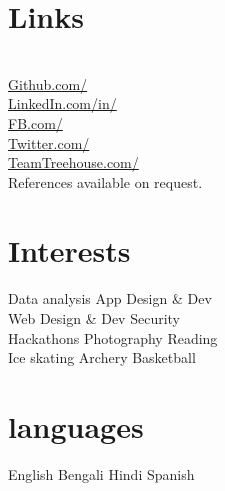 \documentclass[]{deedy-resume-openfont}
\begin{document}
\begin{minipage}[t]{0.32\textwidth}
\section{Links}
\vspace{\topsep}
\href{http://duttaoindril.github.io/}{} \\
\href{http://github.com/duttaoindril}{Github.com/ } \\
\href{https://www.linkedin.com/in/debarghyadas}{LinkedIn.com/in/ } \\
\href{http://www.facebook.com/duttaoindril}{FB.com/ } \\
\href{twitter.com/intent/tweet?screen_name=DuttaOindril}{Twitter.com/ } \\
\href{http://teamtreehouse.com/duttaoindril}{TeamTreehouse.com/ } \\
References available on request.


\section{Interests}
\vspace{\topsep}
 Data analysis \textbullet{} App Design \& Dev\\
Web Design \& Dev \textbullet{} Security\\
 Hackathons \textbullet{} Photography \textbullet{} Reading \\
Ice skating \textbullet{} Archery \textbullet{} Basketball


\section{languages}
\vspace{\topsep}
English \textbullet{} Bengali \textbullet{} Hindi \textbullet{} Spanish


\end{minipage}
\hfill
\end{document}
